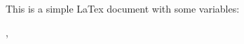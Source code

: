 \documentclass{article}
\begin{document}
This is a simple LaTex document with some variables:

, 
\end{document}

